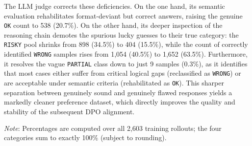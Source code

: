 The LLM judge corrects these deficiencies. On the one hand, its semantic evaluation rehabilitates format-deviant but correct answers, raising the genuine \texttt{OK} count to 538 (20.7\%). On the other hand, its deeper inspection of the reasoning chain demotes the spurious lucky guesses to their true category: the \texttt{RISKY} pool shrinks from 898 (34.5\%) to 404 (15.5\%), while the count of correctly identified \texttt{WRONG} samples rises from 1,054 (40.5\%) to 1,652 (63.5\%). Furthermore, it resolves the vague \texttt{PARTIAL} class down to just 9 samples (0.3\%), as it identifies that most cases either suffer from critical logical gaps (reclassified as \texttt{WRONG}) or are acceptable under semantic criteria (rehabilitated as \texttt{OK}). This sharper separation between genuinely sound and genuinely flawed responses yields a markedly cleaner preference dataset, which directly improves the quality and stability of the subsequent DPO alignment.

\begin{table}[htbp]
\centering
\caption{Diagnosis Quality on the 0.6B Student Training Rollouts: Rule-Based vs. LLM Judge}
\label{tab:judge_ablation}

\vspace{2pt}
{\footnotesize \textit{Note}: Percentages are computed over all 2{,}603 training rollouts; the four categories sum to exactly 100\% (subject to rounding).}
\end{table}
